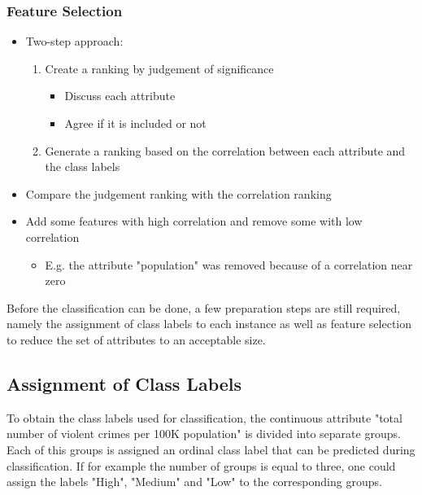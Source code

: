 \begin{frame}
  \frametitle{Feature Selection}
  \begin {itemize}
    \item Two-step approach:
      \begin{enumerate}
        \item Create a ranking by judgement of significance
          \begin{itemize}
            \item Discuss each attribute
            \item Agree if it is included or not
          \end{itemize}
        \item Generate a ranking based on the correlation between each attribute and the class labels
      \end{enumerate}
    \item Compare the judgement ranking with the correlation ranking
    \item Add some features with high correlation and remove some with low correlation
      \begin{itemize}
        \item E.g. the attribute "population" was removed because of a correlation near zero
      \end{itemize}
  \end{itemize}
\end{frame}


Before the classification can be done, a few preparation steps are still
required, namely the assignment of class labels to each instance as
well as feature selection to reduce the set of attributes to an
acceptable size.

\subsection{Assignment of Class Labels}
\label{sec:assignment}

To obtain the class labels used for classification, the
continuous attribute "total number of violent crimes per 100K
population" is divided into separate groups. Each of this groups is
assigned an ordinal class label that can be predicted during classification.
If for example the number of groups is equal to three, one could
assign the labels "High", "Medium" and "Low" to the corresponding
groups.

